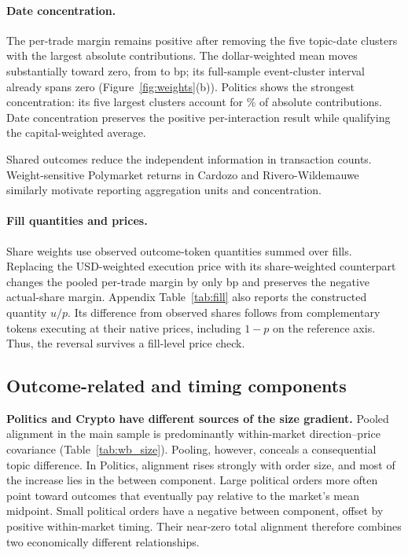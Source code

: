 \documentclass[sigconf,anonymous,nonacm,balance=false]{acmart}
\begin{document}
\paragraph{Date concentration.}
The per-trade margin remains positive after removing the five topic-date clusters with the largest absolute contributions. The dollar-weighted mean moves substantially toward zero, from \ConUsd{} to \ConDrop{} bp; its full-sample event-cluster interval already spans zero (Figure~\ref{fig:weights}(b)). Politics shows the strongest concentration: its five largest clusters account for \ConPolTop\% of absolute contributions. Date concentration preserves the positive per-interaction result while qualifying the capital-weighted average.

Shared outcomes reduce the independent information in transaction counts. Weight-sensitive Polymarket returns in Cardozo and Rivero-Wildemauwe~\cite{cardozo2026favorite} similarly motivate reporting aggregation units and concentration.

\paragraph{Fill quantities and prices.}
Share weights use observed outcome-token quantities summed over fills. Replacing the USD-weighted execution price with its share-weighted counterpart changes the pooled per-trade margin by only \FPRSDiff{} bp and preserves the negative actual-share margin. Appendix Table~\ref{tab:fill} also reports the constructed quantity $u/p$. Its difference from observed shares follows from complementary tokens executing at their native prices, including $1-p$ on the reference axis. Thus, the reversal survives a fill-level price check.

\subsection{Outcome-related and timing components}
\textbf{Politics and Crypto have different sources of the size gradient.} Pooled alignment in the main sample is predominantly within-market direction--price covariance (Table~\ref{tab:wb_size}). Pooling, however, conceals a consequential topic difference. In Politics, alignment rises strongly with order size, and most of the increase lies in the between component. Large political orders more often point toward outcomes that eventually pay relative to the market's mean midpoint. Small political orders have a negative between component, offset by positive within-market timing. Their near-zero total alignment therefore combines two economically different relationships.
\end{document}
